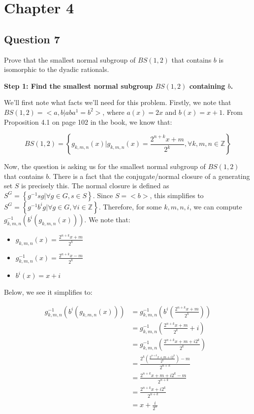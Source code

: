 \documentclass[12pt]{article}%
\newcommand{\Z}{\mathbb{Z}}
\begin{document}
\section*{Chapter 4}

\subsection*{Question 7}

Prove that the smallest normal subgroup of $BS(1, 2)$ that contains $b$ is isomorphic to the dyadic
rationals.

\textbf{Step 1: Find the smallest normal subgroup $BS(1,2)$ containing $b$.}

We'll first note what facts we'll need for this problem. Firstly, we note that $BS(1,2)=<a,b|aba^1=b^2>$,
where $a(x)=2x$ and $b(x)=x+1$.  From Proposition 4.1 on page 102 in the book, we know that:

\begin{equation}
BS(1,2)=\left\{g_{k,m,n}(x) | g_{k,m,n}(x)=\frac{2^{n+k}x+m}{2^k}, \forall k, m, n \in \Z \right\}
\end{equation}

Now, the question is asking us for the smallest normal subgroup of $BS(1,2)$ that contains $b$. There is a
fact that the conjugate/normal closure of a generating set $S$ is precisely this. The normal closure is
defined as $S^G=\left\{g^{-1}sg|\forall g\in G, s\in S\right\}$. Since $S=<b>$, this simplifies to
$S^G=\left\{g^{-1}b^{i}g|\forall g\in G, \forall i \in \Z \right\}$. Therefore, for some $k, m, n, i$, we
can compute $g_{k,m,n}^{-1}(b^{i}(g_{k,m,n}(x)))$. We note that:

\begin{itemize}
\item $g_{k,m,n}(x)=\frac{2^{n+k}x+m}{2^k}$ 
\item $g_{k,m,n}^{-1}(x)=\frac{2^{n+k}x-m}{2^k}$ 
\item $b^{i}(x)=x+i$ %
\end{itemize}
Below, we see it simplifies to:

\begin{align*}
g_{k,m,n}^{-1}(b^{i}(g_{k,m,n}(x)))
&= g_{k,m,n}^{-1}\left(b^{i}\left(\frac{2^{n+k}x+m}{2^k}\right)\right) \\
&= g_{k,m,n}^{-1}\left(\frac{2^{n+k}x+m}{2^k}+i\right) \\
&= g_{k,m,n}^{-1}\left(\frac{2^{n+k}x+m+i2^k}{2^k}\right) \\
&= \frac{2^k\left(\frac{2^{n+k}x+m+i2^k}{2^k}\right)-m}{2^{n+k}} \\
&= \frac{2^{n+k}x+m+i2^k-m}{2^{n+k}} \\
&= \frac{2^{n+k}x+i2^k}{2^{n+k}} \\
&= x+\frac{i}{2^{n}}
\end{align*}
\end{document}
